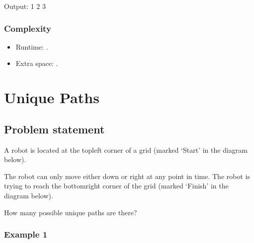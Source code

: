 \documentclass[letterpaper,12pt,english]{book}
\begin{document}
\begin{sphinxVerbatim}[commandchars=\\\{\}]
Output:
1
2
3
\end{sphinxVerbatim}


\subsubsection{Complexity}
\label{\detokenize{Dynamic_Programming/05_DP_509_Fibonacci_Number:id3}}\begin{itemize}
\item {} 
\sphinxAtStartPar
Runtime: .

\item {} 
\sphinxAtStartPar
Extra space: .

\end{itemize}

\sphinxstepscope


\section{Unique Paths}
\label{\detokenize{Dynamic_Programming/05_DP_62_Unique_Paths:unique-paths}}\label{\detokenize{Dynamic_Programming/05_DP_62_Unique_Paths::doc}}

\subsection{Problem statement\sphinxfootnotemark[98]}
\label{\detokenize{Dynamic_Programming/05_DP_62_Unique_Paths:problem-statement}}%
\begin{footnotetext}[98]\sphinxAtStartFootnote
{}
%
\end{footnotetext}\ignorespaces 
\sphinxAtStartPar
A robot is located at the top\sphinxhyphen{}left corner of a  grid (marked ‘Start’ in the diagram below).

\sphinxAtStartPar
The robot can only move either down or right at any point in time. The robot is trying to reach the bottom\sphinxhyphen{}right corner of the grid (marked ‘Finish’ in the diagram below).

\sphinxAtStartPar
How many possible unique paths are there?


\subsubsection{Example 1}
\label{\detokenize{Dynamic_Programming/05_DP_62_Unique_Paths:example-1}}
\sphinxAtStartPar
{}
\end{document}
